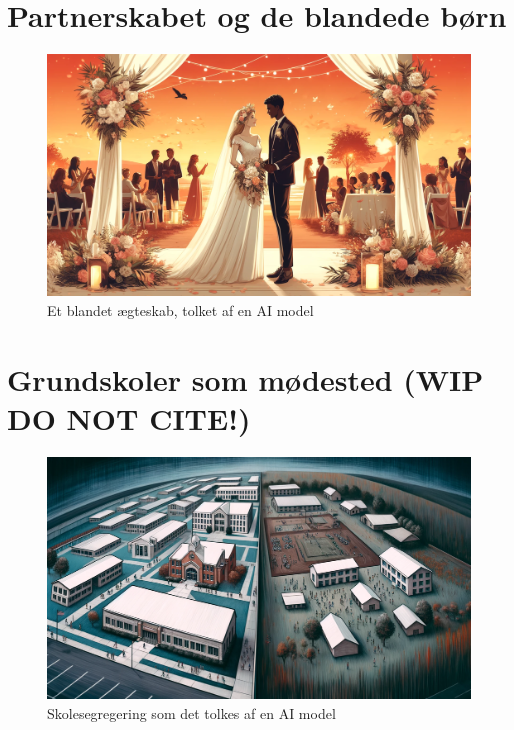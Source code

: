 \documentclass[
]{book}
\begin{document}
\chapter{Partnerskabet og de blandede børn}\label{kap2}

\begin{figure}
\includegraphics[width=1\linewidth]{images/dalle-wedding} \caption{Et blandet ægteskab, tolket af en AI model}\label{fig:fig-partner}
\end{figure}

\chapter{\texorpdfstring{Grundskoler som mødested (\textbf{WIP DO NOT CITE!})}{Grundskoler som mødested (WIP DO NOT CITE!)}}\label{kap3}

\begin{figure}
\includegraphics[width=1\linewidth]{images/dalle-schoolseg} \caption{Skolesegregering som det tolkes af en AI model}\label{fig:fig-schoolseg}
\end{figure}
\end{document}
